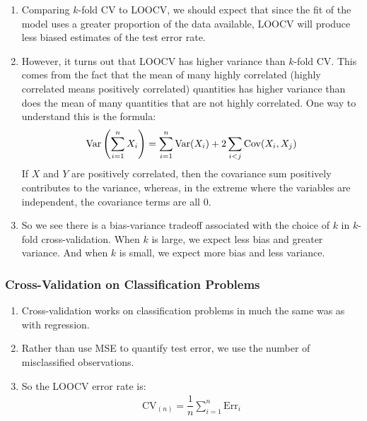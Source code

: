 \documentclass[10pt]{article}
\newcommand{\Var}{{\rm Var}}
\begin{document}
\begin{enumerate}
	\item Comparing $k$-fold CV to LOOCV, we should expect that since the fit of the model uses a greater proportion of the data available, LOOCV will produce less biased estimates of the test error rate.
	\item However, it turns out that LOOCV has higher variance than $k$-fold CV.  This comes from the fact that the mean of many highly correlated (highly correlated means positively correlated) quantities has higher variance than does the mean of many quantities that are not highly correlated.  One way to understand this is the formula:
	\begin{align*}
		\Var\left(\sum_{i = 1}^n X_i \right) = \sum_{i =1}^n \Var(X_i) + 2\sum_{i < j} \mathrm{Cov}(X_i, X_j) 
	\end{align*}
	If $X$ and $Y$ are positively correlated, then the covariance sum positively contributes to the variance, whereas, in the extreme where the variables are independent, the covariance terms are all 0.
	\item So we see there is a bias-variance tradeoff associated with the choice of $k$ in $k$-fold cross-validation.  When $k$ is large, we expect less bias and greater variance.  And when $k$ is small, we expect more bias and less variance.
\end{enumerate}

\subsubsection{Cross-Validation on Classification Problems} 
\begin{enumerate}
	\item Cross-validation works on classification problems in much the same was as with regression.  
	\item Rather than use MSE to quantify test error, we use the number of misclassified observations.
	\item So the LOOCV error rate is:
	\begin{align*}
		\mathrm{CV}_{(n)} = \dfrac{1}{n} \sum_{i = 1}^n \mathrm{Err}_i
	\end{align*}
\end{enumerate}
\end{document}
